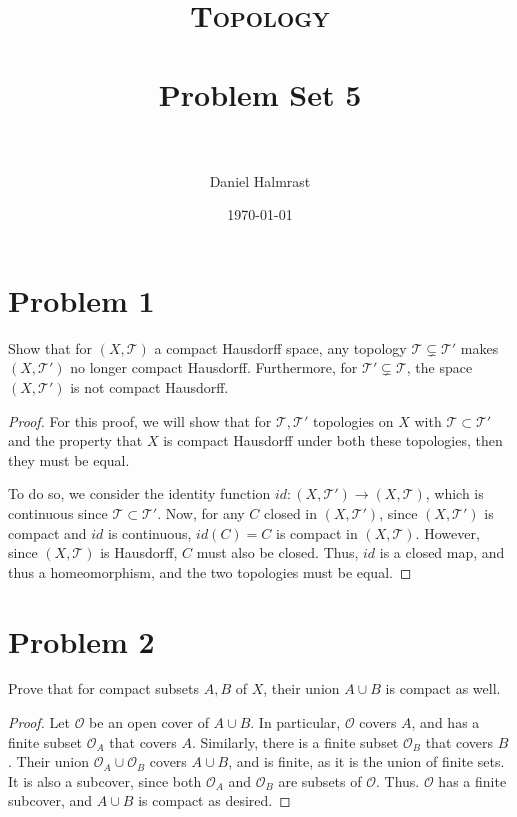 \documentclass[fontsize=11pt]{scrartcl} %
\title{	
\normalfont \normalsize 
\textsc{Topology} \\ [25pt] %
\horrule{0.5pt} \\[0.4cm] %
\huge Problem Set 5 \\ %
\horrule{2pt} \\[0.5cm] %
}
\author{Daniel Halmrast} %
\date{\normalsize\today} %
\numberwithin{equation}{section} %
\numberwithin{figure}{section} %
\numberwithin{table}{section} %
\begin{document}
\maketitle %

\section*{Problem 1}
Show that for $(X,\mathscr{T})$ a compact Hausdorff space, any topology
$\mathscr{T}\subsetneq\mathscr{T}'$ makes $(X,\mathscr{T}')$ no longer compact
Hausdorff. Furthermore, for $\mathscr{T}'\subsetneq\mathscr{T}$, the space
$(X,\mathscr{T}')$ is not compact Hausdorff.
\\
\begin{proof}
    For this proof, we will show that for $\mathscr{T},\mathscr{T}'$ topologies
    on $X$ with $\mathscr{T}\subset\mathscr{T}'$ and the property that $X$ is
    compact Hausdorff under both these topologies, then they must be equal.

    To do so, we consider the identity function
    $id:(X,\mathscr{T}')\to(X,\mathscr{T})$, which is continuous since
    $\mathscr{T}\subset\mathscr{T}'$. Now, for any $C$ closed in
    $(X,\mathscr{T}')$, since $(X,\mathscr{T}')$ is compact and $id$ is
    continuous, $id(C)=C$ is compact in $(X,\mathscr{T})$. However, since
    $(X,\mathscr{T})$ is Hausdorff, $C$ must also be closed. Thus, $id$ is a
    closed map, and thus a homeomorphism, and the two topologies must be equal.
\end{proof}

\section*{Problem 2}
Prove that for compact subsets $A,B$ of $X$, their union $A\cup B$ is compact as
well.
\\
\begin{proof}
    Let $\mathscr{O}$ be an open cover of $A\cup B$. In particular,
    $\mathscr{O}$ covers $A$, and has a finite subset $\mathscr{O}_A$ that
    covers $A$. Similarly, there is a finite subset $\mathscr{O}_B$ that
    covers $B$. Their union $\mathscr{O}_A\cup\mathscr{O}_B$ covers $A\cup B$,
    and is finite, as it is the union of finite sets. It is also a subcover,
    since both $\mathscr{O}_A$ and $\mathscr{O}_B$ are subsets of
    $\mathscr{O}$. Thus. $\mathscr{O}$ has a finite subcover, and $A\cup B$ is
    compact as desired.
\end{proof}
\end{document}
